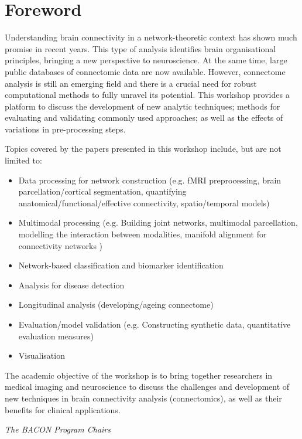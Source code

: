 \section*{Foreword}

Understanding brain connectivity in a network-theoretic context has shown much promise in recent years. This type of analysis identifies brain organisational principles, bringing a new perspective to neuroscience. At the same time, large public databases of connectomic data are now available. However, connectome analysis is still an emerging field and there is a crucial need for robust computational methods to fully unravel its potential. This workshop provides a platform to discuss the development of new analytic techniques; methods for evaluating and validating commonly used approaches; as well as the effects of variations in pre-processing steps.

\bigskip

Topics covered by the papers presented in this workshop include, but are not limited to:

\begin{itemize}
\item Data processing for network construction (e.g. fMRI preprocessing, brain parcellation/cortical segmentation, quantifying anatomical/functional/effective connectivity, spatio/temporal models)
\item Multimodal processing (e.g. Building joint networks, multimodal parcellation, modelling the interaction between modalities, manifold alignment for connectivity networks )
\item Network-based classification and biomarker identification
\item Analysis for disease detection
\item Longitudinal analysis (developing/ageing connectome)
\item Evaluation/model validation (e.g. Constructing synthetic data, quantitative evaluation measures)
\item Visualisation
\end{itemize}

\bigskip

The academic objective of the workshop is to bring together researchers in medical imaging and neuroscience to discuss the challenges and development of new techniques in brain connectivity analysis (connectomics), as well as their benefits for clinical applications. 



\vfill

\textit{The BACON Program Chairs}

\pagebreak